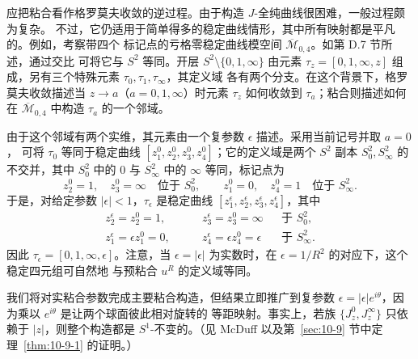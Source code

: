 \begin{remark}\label{rem:10-2-4}
应把粘合看作格罗莫夫收敛的逆过程。由于构造 $J$-全纯曲线很困难，一般过程颇为复杂。
不过，它仍适用于简单得多的稳定曲线情形，其中所有映射都是平凡的。例如，考察带四个
标记点的亏格零稳定曲线模空间 $\overline{\mathcal M}_{0,4}$。如第 D.7 节所述，通过交比
可将它与 $S^2$ 等同。开层 $S^2\setminus\{0,1,\infty\}$ 由元素
$\tau_z=[0,1,\infty,z]$ 组成，另有三个特殊元素 $\tau_0,\tau_1,\tau_\infty$，其定义域
各有两个分支。在这个背景下，格罗莫夫收敛描述当 $z\to a$（$a=0,1,\infty$）时元素
$\tau_z$ 如何收敛到 $\tau_a$；粘合则描述如何在
$\overline{\mathcal M}_{0,4}$ 中构造 $\tau_a$ 的一个邻域。

由于这个邻域有两个实维，其元素由一个复参数 $\epsilon$ 描述。采用当前记号并取 $a=0$，
可将 $\tau_0$ 等同于稳定曲线 $[z_1^0,z_2^0,z_3^0,z_4^0]$；它的定义域是两个
$S^2$ 副本 $S_0^2,S_\infty^2$ 的不交并，其中 $S_0^2$ 中的 $0$ 与
$S_\infty^2$ 中的 $\infty$ 等同，标记点为
\[
  z_2^0=1,
  \quad z_3^0=\infty\quad\text{位于 }S_0^2,
  \qquad
  z_1^0=0,
  \quad z_4^0=1\quad\text{位于 }S_\infty^2.
\]
于是，对给定参数 $|\epsilon|<1$，$\tau_\epsilon$ 是稳定曲线
$[z_1^\epsilon,z_2^\epsilon,z_3^\epsilon,z_4^\epsilon]$，其中
\[
  \begin{aligned}
  z_2^\epsilon=z_2^0=1,
  &\qquad z_3^\epsilon=z_3^0=\infty &&\text{于 }S_0^2,\\
  z_1^\epsilon=\epsilon z_1^0=0,
  &\qquad z_4^\epsilon=\epsilon z_4^0=\epsilon &&\text{于 }S_\infty^2.
  \end{aligned}
\]
因此 $\tau_\epsilon=[0,1,\infty,\epsilon]$。注意，当
$\epsilon=|\epsilon|$ 为实数时，在 $\epsilon=1/R^2$ 的对应下，这个稳定四元组可自然地
与预粘合 $u^R$ 的定义域等同。

我们将对实粘合参数完成主要粘合构造，但结果立即推广到复参数
$\epsilon=|\epsilon|e^{i\theta}$，因为乘以 $e^{i\theta}$ 是让两个球面彼此相对旋转的
等距映射。事实上，若族 $\{J_z^0,J_z^\infty\}$ 只依赖于 $|z|$，则整个构造都是
$S^1$-不变的。（见 McDuff  以及第~\ref{sec:10-9} 节中定理~\ref{thm:10-9-1} 的证明。）
\end{remark}

